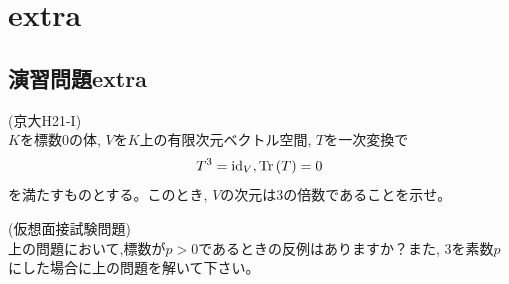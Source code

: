 \section{extra}%


\subsection{演習問題extra}

\begin{prob} (京大H21-I)\\
$K$を標数$0$の体, $V$を$K$上の有限次元ベクトル空間, $T$を一次変換で
\[T^3=\mathrm{id}_{V}, \mathrm{Tr}\left( T \right)=0\]
を満たすものとする。このとき, $V$の次元は$3$の倍数であることを示せ。
\end{prob}
\begin{prob} (仮想面接試験問題)\\
上の問題において,標数が$p>0$であるときの反例はありますか？また, $3$を素数$p$にした場合に上の問題を解いて下さい。
\end{prob}


\clearpage
